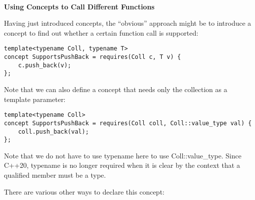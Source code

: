 \noindent
\hspace*{\fill} \\ %
\textbf{Using Concepts to Call Different Functions}

Having just introduced concepts, the “obvious” approach might be to introduce a concept to find out whether a certain function call is supported:

\begin{lstlisting}[style=styleCXX]
template<typename Coll, typename T>
concept SupportsPushBack = requires(Coll c, T v) {
	c.push_back(v);
};
\end{lstlisting}

Note that we can also define a concept that needs only the collection as a template parameter:

\begin{lstlisting}[style=styleCXX]
template<typename Coll>
concept SupportsPushBack = requires(Coll coll, Coll::value_type val) {
	coll.push_back(val);
};
\end{lstlisting}

Note that we do not have to use typename here to use Coll::value\_type. Since C++20, typename is no longer required when it is clear by the context that a qualified member must be a type.

There are various other ways to declare this concept:

